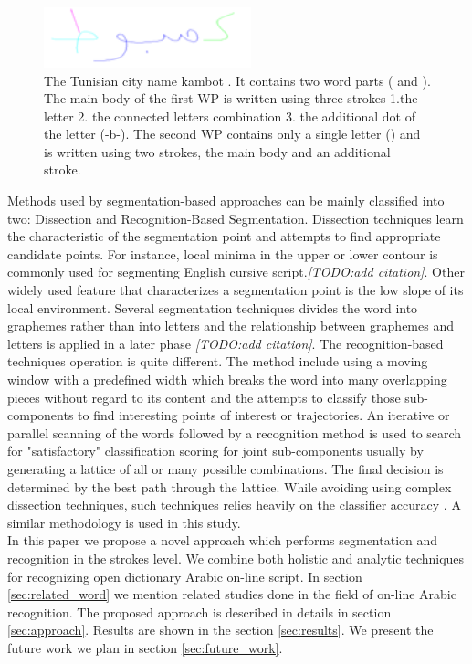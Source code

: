 \documentclass[journal,compsoc]{IEEEtran}
\begin{document}
\begin{figure}
\centering
\includegraphics[width=6cm]{./figures/kmbot_color}       
\caption{The Tunisian city name kambot . It contains two word parts ( and ). The main body of the first WP is written using three strokes 1.the letter  2. the connected letters combination  3. the additional dot of the letter \RL(-b-). The second WP contains only a single letter () and is written using two strokes, the main body and an additional stroke.}
\label{fig:kmbot}
\end{figure}

Methods used by segmentation-based approaches can be mainly classified into two: Dissection and Recognition-Based Segmentation. Dissection techniques learn the characteristic of the segmentation point and attempts to find appropriate candidate points. For instance, local minima in the upper or lower contour is commonly used for segmenting English cursive script.\emph{[TODO:add citation]}. Other widely used feature that characterizes a segmentation point is the low slope of its local environment. Several segmentation techniques divides the word into graphemes rather than into letters and the relationship between graphemes and letters is applied in a later phase \emph{[TODO:add citation]}. The recognition-based techniques operation is quite different. The method include using a moving window with a predefined width which breaks the word into many overlapping pieces without regard to its content and the attempts to classify those sub-components to find interesting points of interest or trajectories. An iterative or parallel scanning of the words followed by a recognition method is used to search for "satisfactory" classification scoring for joint sub-components usually by generating a lattice of all or many possible combinations. The final decision is determined by the best path through the lattice. While avoiding using complex dissection techniques, such techniques relies heavily on the classifier accuracy \cite{casey1996survey}. A similar methodology is used in this study.\\

In this paper we propose a novel approach which performs segmentation and recognition in the strokes level. We combine both holistic and analytic techniques for recognizing open dictionary Arabic on-line script. In section \ref{sec:related_word} we mention related studies done in the field of on-line Arabic recognition. The proposed approach is described in details in section \ref{sec:approach}. Results are shown in the section \ref{sec:results}. We present the future work we plan in section \ref{sec:future_work}.
\end{document}

